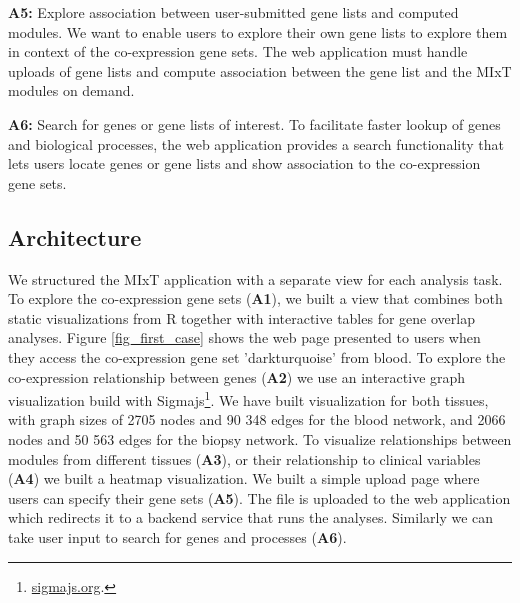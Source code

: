 \textbf{A5:} Explore association between user-submitted gene lists and computed
modules. We want to enable users to explore their own gene lists to explore
them in context of the co-expression gene sets. The web application must handle
uploads of gene lists and compute association between the gene list and the MIxT
modules on demand. 

\textbf{A6:} Search for genes or gene lists of interest. To facilitate faster
lookup of genes and biological processes, the web application provides a search
functionality that lets users locate genes or gene lists and show association to
the co-expression gene sets. 

\subsection{Architecture} 
We structured the MIxT application with a separate view for each analysis task.
To explore the co-expression gene sets (\textbf{A1}), we built a view that
combines both static visualizations from R together with interactive tables for
gene overlap analyses. Figure \ref{fig_first_case} shows the web page presented
to users when they access the co-expression gene set 'darkturquoise' from blood.
To explore the co-expression relationship between genes (\textbf{A2}) we use an
interactive graph visualization build with Sigmajs\footnote{\url{sigmajs.org}.}.
We have built visualization for both tissues, with graph sizes of 2705 nodes and
90 348 edges for the blood network, and 2066 nodes and 50 563 edges for the
biopsy network. 
To visualize relationships between modules from different tissues (\textbf{A3}),
or their relationship to clinical variables (\textbf{A4}) we built a heatmap
visualization.
We built a simple upload page where users can specify their gene sets
(\textbf{A5}). The file is uploaded to the web application which redirects it to
a backend service that runs the analyses. Similarly we can take user input to
search for genes and processes (\textbf{A6}).


